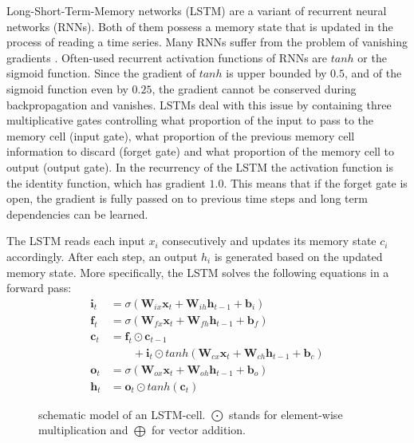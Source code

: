 \documentclass[11pt,a4paper]{article}
\begin{document}
Long-Short-Term-Memory networks (LSTM) \cite{hochreiter1997long} are a variant of recurrent neural networks (RNNs). Both of them possess a memory state that is updated in the process of reading a time series. Many RNNs suffer from the problem of vanishing gradients \cite{hochreiter1997long}. Often-used recurrent activation functions of RNNs are $tanh$ or the sigmoid function. Since the gradient of $tanh$ is upper bounded by $0.5$, and of the sigmoid function even by $0.25$, the gradient cannot be conserved during backpropagation and vanishes. LSTMs deal with this issue by containing three multiplicative gates controlling what proportion of the input to pass to the memory cell (input gate), what proportion of the previous memory cell information to discard (forget gate) and what proportion of the memory cell to output (output gate). In the recurrency of the LSTM the activation function is the identity function, which has gradient $1.0$. This means that if the forget gate is open, the gradient is fully passed on to previous time steps and long term dependencies can be learned.

The LSTM reads each input $x_i$ consecutively and updates its memory state $c_i$ accordingly. After each step, an output $h_i$ is generated based on the updated memory state. More specifically, the LSTM solves the following equations in a forward pass:
%
\begin{equation}
\begin{split}
    \mathbf{i}_t &= \sigma(\mathbf{W}_{ix}\mathbf{x}_t+\mathbf{W}_{ih}\mathbf{h}_{t-1}+\mathbf{b}_i) \\
    \mathbf{f}_t &= \sigma(\mathbf{W}_{fx}\mathbf{x}_t+\mathbf{W}_{fh}\mathbf{h}_{t-1}+\mathbf{b}_f) \\
    \mathbf{c}_t &= \mathbf{f}_t \odot \mathbf{c}_{t-1}\\
    & \qquad +\mathbf{i}_t \odot tanh(\mathbf{W}_{cx}\mathbf{x}_t + \mathbf{W}_{ch}\mathbf{h}_{t-1}+\mathbf{b}_c) \\
    \mathbf{o}_t &= \sigma(\mathbf{W}_{ox}\mathbf{x}_t + \mathbf{W}_{oh}\mathbf{h}_{t-1} + \mathbf{b}_o)\\
    \mathbf{h}_t &= \mathbf{o}_t \odot tanh(\mathbf{c}_t) 
    \label{eq:lstm_equations}
\end{split}
\end{equation}

\begin{figure}[h]
    \centering
    
    \caption{schematic model of an LSTM-cell. $\bigodot$ stands for element-wise multiplication and $\bigoplus$ for vector addition.}
    \label{fig:lstm_cell}

\end{figure}
%
\end{document}
